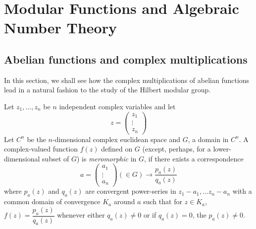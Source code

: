 

\chapter{Modular Functions and Algebraic Number Theory}\label{chap3}

\section{Abelian functions and complex
  multiplications}\label{chap3:sec1}\pageoriginale

In this section, we shall see how the complex multiplications of
abelian functions lead in a natural fashion to the study of the
Hilbert modular group.

Let $z_{1},\ldots,z_{n}$ be $n$ independent complex variables and let
$$
z=
\begin{pmatrix}
z_{1}\\
\vdots\\
z_{n}
\end{pmatrix}
$$
Let $C^{n}$ be the $n$-dimensional complex euclidean space and $G$, a
domain in $C^{n}$. A complex-valued function $f(z)$ defined on $G$
(except, perhaps, for a lower-dimensional subset of $G$) is {\em
  meromorphic} in $G$, if there exists a correspondence
$$
a=
\begin{pmatrix}
a_{1}\\
\vdots\\
a_{n}
\end{pmatrix}
(\in G)\to \frac{p_{a}(z)}{q_{a}(z)}
$$
where $p_{a}(z)$ and $q_{a}(z)$ are convergent power-series in
$z_{1}-a_{1},\ldots z_{n}-a_{n}$ with a common domain of convergence
$K_{a}$ around $a$ such that for $z\in K_{a}$,
$f(z)=\dfrac{p_{a}(z)}{q_{a}(z)}$ whenever either $q_{a}(z)\neq 0$ or
if $q_{a}(z)=0$, the $p_{a}(z)\neq 0$.

